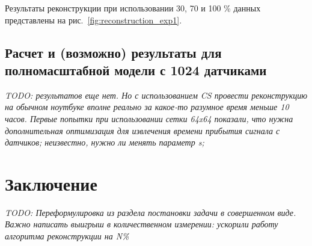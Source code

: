 \documentclass[14pt]{matmex-diploma}
\begin{document}
Результаты реконструкции при использовании 30, 70 и 100 \% данных представлены на рис.~\ref{fig:reconstruction_exp1}.




\subsection{Расчет и (возможно) результаты для полномасштабной модели с 1024 датчиками}
\textit{TODO: результатов еще нет. Но с использованием CS провести реконструкцию на обычном ноутбуке вполне реально за какое-то разумное время меньше 10 часов. Первые попытки при использовании сетки 64x64 показали, что нужна дополнительная оптимизация для извлечения времени прибытия сигнала с датчиков; неизвестно, нужно ли менять параметр s; }\\

\section{Заключение}
\textit{TODO: Переформулировка из раздела постановки задачи в совершенном виде. Важно написать выигрыш в количественном измерении: ускорили работу алгоритма реконструкции на N\%} \\
\\
\\






\setmonofont[Mapping=tex-text]{CMU Typewriter Text}


\end{document}
